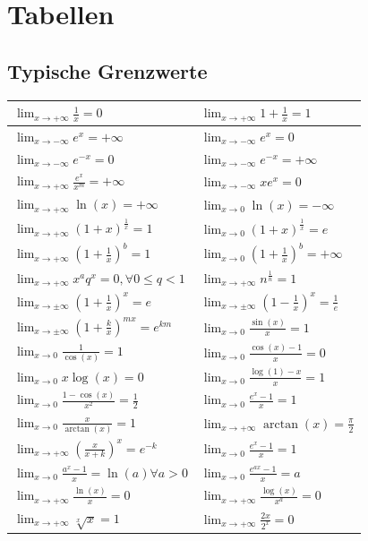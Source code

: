 \documentclass[a4paper,8pt]{extarticle}
\begin{document}
\section{Tabellen}
\def\limxpi{\lim_{x\to +\infty}}
\def\limxmi{\lim_{x\to -\infty}}
\def\limxi{\lim_{x\to \pm \infty}}
\subsection{Typische Grenzwerte}
\begin{center}
  \begin{tabular}[]{|l|l|}
    \hline
    $\limxpi \frac{1}{x} = 0$ & $\limxpi 1 + \frac{1}{x} = 1$ \\
    \hline
    $\limxmi e^x = +\infty$ & $\limxmi e^x = 0$ \\
    \hline
    $\limxmi e^{-x} = 0$ & $\limxmi e^{-x} = +\infty$ \\
    \hline
    $\limxpi \frac{e^x}{x^m} = +\infty$ & $\limxmi x e^x = 0$ \\
    \hline
    $\limxpi \ln(x) = +\infty$ & $\lim_{x \to 0} \ln(x) = -\infty$ \\
    \hline
    $\limxpi (1 + x)^{\frac{1}{x}} = 1$ & $\lim_{x \to 0} (1 + x)^{\frac{1}{x}} = e$ \\
    \hline
    $\limxpi (1 + \frac{1}{x})^b = 1$ &  $\lim_{x \to 0} (1 + \frac{1}{x})^b = +\infty$\\
    \hline
    $\limxpi x^aq^x = 0, \forall 0 \leq q < 1$ & $\limxpi n^{\frac{1}{n}} = 1$\\
    \hline
    $\limxi (1 + \frac{1}{x})^x = e$ & $\limxi (1 - \frac{1}{x})^x = \frac{1}{e}$ \\
    \hline
    $\limxi (1 + \frac{k}{x})^{mx} = e^{km}$ & $\lim_{x \to 0} \frac{\sin(x)}{x} = 1$ \\
    \hline
    $\lim_{x \to 0} \frac{1}{\cos(x)} = 1$ & $\lim_{x \to 0} \frac{\cos(x) - 1}{x} = 0$ \\
    \hline
    $\lim_{x \to 0} x\log(x) = 0$ & $\lim_{x \to 0} \frac{\log(1) - x}{x} = 1$ \\
    \hline
    $\lim_{x \to 0} \frac{1 - \cos(x)}{x^2} = \frac{1}{2}$ & $\lim_{x \to 0} \frac{e^x - 1}{x} = 1$ \\
    \hline
    $\lim_{x \to 0} \frac{x}{\arctan(x)} = 1$ & $\limxpi \arctan(x) = \frac{\pi}{2}$ \\
    \hline
    $\limxpi \left( \frac{x}{x+k}  \right) ^x = e^{-k}$ & $\lim_{x \to 0} \frac{e^x - 1}{x} = 1$ \\
    \hline
    $\lim_{x \to 0} \frac{a^x - 1}{x} = \ln(a)  \forall a > 0$ & $\lim_{x \to 0} \frac{e^{ax}-1}{x} = a$ \\
    \hline
    $\limxpi \frac{\ln(x)}{x} = 0$ & $\limxpi \frac{\log(x)}{x^a} = 0$ \\
    \hline
    $\limxpi \sqrt[x]{x} = 1$ & $\limxpi \frac{2x}{2^x} = 0$ \\
    \hline
  \end{tabular}
\end{center}
\end{document}
